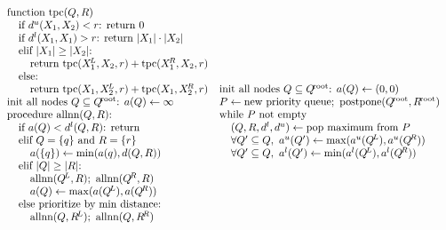 \documentclass{article}
\newcommand{\disthrectmin}{d^{l}}
\newcommand{\disthrectmax}{d^{u}}
\newcommand{\dist}[2]{d(#1,#2)}
\newcommand{\kdroot}[1]{#1^{\!\text{root}}}
\newcommand{\kdleft}[1]{#1^{\!L}}
\newcommand{\kdright}[1]{#1^{\!R}}
\newcommand{\al}{a^l}
\newcommand{\au}{a^u}
\newcommand{\dl}{d^l}
\newcommand{\du}{d^u}
\newcommand{\x}{\\ \hspace{0.15in}}
\newcommand{\xx}{\\ \hspace{0.3in}}
\begin{document}
\begin{figure}
  \begin{displaymath}
    \begin{array}{ll}
      \hspace{-0.17in}
      \begin{array}{l}
        \begin{array}{l}
          \text{function tpc}(Q, R)
          \x \text{if }\disthrectmax(X_1, X_2) < r\text{: return }0
          \x \text{if }\disthrectmin(X_1, X_1) > r\text{: return } |X_1| \cdot |X_2|
          \x \text{elif }|X_1| \geq |X_2|\text{:}
          \xx \text{return tpc}(\kdleft{X_1}, X_2, r) + \text{tpc}(\kdright{X_1}, X_2, r)
          \x \text{else:}
          \xx \text{return tpc}(X_1, \kdleft{X_2}, r) + \text{tpc}(X_1, \kdright{X_2}, r)
        \end{array}
        \\
        \begin{array}{l}
          \text{init all nodes }Q \subseteq \kdroot{Q}\text{: }a(Q) \gets \infty
          \\ \text{procedure allnn}(Q,R)\text{:}
          \x \text{if }a(Q) < \disthrectmin(Q, R)\text{: return}
          \x \text{elif }Q = \{q\} \text{ and } R = \{r\}
          \xx a(\{q\}) \gets \min(a(q), \dist{Q}{R})
          \x \text{elif }|Q| \geq |R|\text{:}
          \xx \text{allnn}(\kdleft{Q}, R); \text{ allnn}(\kdright{Q}, R)
          \xx a(Q) \gets \max(a(\kdleft{Q}), a(\kdright{Q}))
          \x \text{else prioritize by min distance:}
          \xx \text{allnn}(Q, \kdleft{R}); \text{ allnn}(Q, \kdright{R})
        \end{array}
      \end{array}
      & \hspace{-0.2in}
      \begin{array}{l}
        \\ \text{init all nodes }Q \subseteq \kdroot{Q}\text{: }a(Q) \gets (0, 0)
        \\ P \gets \text{new priority queue};~\text{postpone}(\kdroot{Q}, \kdroot{R})
        \\ \text{while } P \text{ not empty}
        \x (Q, R, \dl, \du) \gets \text{pop maximum from }P
        \x \forall Q' \subseteq Q,~ \au(Q') \gets \max(\au(\kdleft{Q}), \au(\kdright{Q}))
        \x \forall Q' \subseteq Q,~ \al(Q') \gets \min(\al(\kdleft{Q}), \al(\kdright{Q}))

\end{array}
\end{array}
\end{displaymath}
\end{figure}
\end{document}
